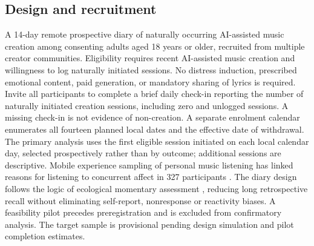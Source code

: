 \documentclass[11pt]{article}
\begin{document}
\subsection{Design and recruitment}
A 14-day remote prospective diary of naturally occurring AI-assisted music creation among consenting adults aged 18 years or older, recruited from multiple creator communities. Eligibility requires recent AI-assisted music creation and willingness to log naturally initiated sessions. No distress induction, prescribed emotional content, paid generation, or mandatory sharing of lyrics is required. Invite all participants to complete a brief daily check-in reporting the number of naturally initiated creation sessions, including zero and unlogged sessions. A missing check-in is not evidence of non-creation. A separate enrolment calendar enumerates all fourteen planned local dates and the effective date of withdrawal. The primary analysis uses the first eligible session initiated on each local calendar day, selected prospectively rather than by outcome; additional sessions are descriptive. Mobile experience sampling of personal music listening has linked reasons for listening to concurrent affect in 327 participants \citep{randall2017}. The diary design follows the logic of ecological momentary assessment \citep{shiffman2008}, reducing long retrospective recall without eliminating self-report, nonresponse or reactivity biases. A feasibility pilot precedes preregistration and is excluded from confirmatory analysis. The target sample is provisional pending design simulation and pilot completion estimates.
\end{document}
